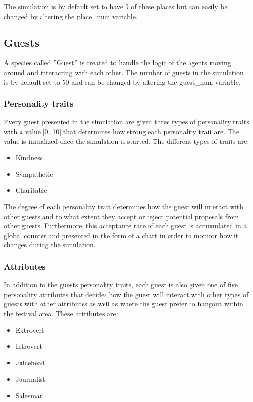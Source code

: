 \documentclass[a4paper,10pt]{article}
\begin{document}
The simulation is by default set to have 9 of these places but can easily be changed by altering the place\_num variable. 

\subsection{Guests}
A species called ”Guest” is created to handle the logic of the agents moving around and interacting with each other. The number of guests in the simulation is by default set to 50 and can be changed by altering the guest\_num variable. 

\subsubsection{Personality traits}
Every guest presented in the simulation are given three types of personality traits with a value [0, 10] that determines how strong each personality trait are. The value is initialized once the simulation is started. The different types of traits are:

\begin{itemize}
    \item Kindness
    \item Sympathetic
    \item Charitable
    
\end{itemize}
The degree of each personality trait determines how the guest will interact with other guests and to what extent they accept or reject potential proposals from other guests. Furthermore, this acceptance rate of each guest is accumulated in a global counter and presented in the form of a chart in order to monitor how it changes during the simulation. 

\subsubsection{Attributes}
In addition to the guests personality traits, each guest is also given one of five personality attributes that decides how the guest will interact with other types of guests with other attributes as well as where the guest prefer to hangout within the festival area. These attributes are:

\begin{itemize}
    \item Extrovert
    \item Introvert
    \item Juicehead
    \item Journalist
    \item Salesman
\end{itemize}
\end{document}
